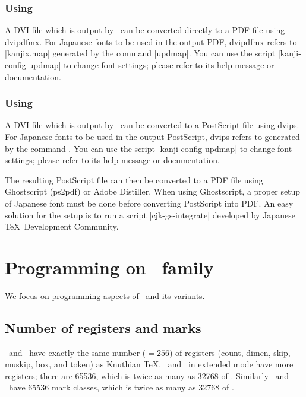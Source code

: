 \documentclass[a4paper,11pt,dvipdfmx]{article}
\let\emph=\origemph
\begin{document}
\subsubsection{Using \emph{dvipdfmx}}

A DVI file which is output by \pTeX\ can be converted directly to a PDF file
using dvipdfmx.
For Japanese fonts to be used in the output PDF, dvipdfmx refers to
|kanjix.map| generated by the command |updmap|.
You can use the script |kanji-config-updmap| to change font settings;
please refer to its help message or documentation.

\subsubsection{Using \emph{dvips}}

A DVI file which is output by \pTeX\ can be converted to a PostScript file
using dvips.
For Japanese fonts to be used in the output PostScript, dvips refers to
 generated by the command .
You can use the script |kanji-config-updmap| to change font settings;
please refer to its help message or documentation.

The resulting PostScript file can then be converted to
a PDF file using Ghostscript (ps2pdf) or Adobe Distiller.
When using Ghostscript, a proper setup of Japanese font must be done
before converting PostScript into PDF.
An easy solution for the setup is to run a script |cjk-gs-integrate|
developed by Japanese \TeX\ Development Community.

\section{Programming on \pTeX\ family}

We focus on programming aspects of \pTeX\ and its variants.

\subsection{Number of registers and marks}

\pTeX\ and \upTeX\ have exactly the same number ($=256$) of registers
(count, dimen, skip, muskip, box, and token) as Knuthian \TeX.
\epTeX\ and \eupTeX\ in extended mode have more registers;
there are 65536, which is twice as many as 32768 of \eTeX.
Similarly \epTeX\ and \eupTeX\ have 65536 mark classes,
which is twice as many as 32768 of \eTeX.
\end{document}
